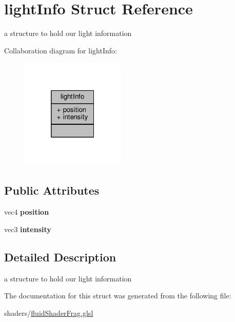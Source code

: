 \hypertarget{structlight_info}{\section{light\-Info Struct Reference}
\label{structlight_info}
}


a structure to hold our light information  




Collaboration diagram for light\-Info\-:\nopagebreak
\begin{figure}[H]
\begin{center}
\leavevmode
\includegraphics[width=140pt]{structlight_info__coll__graph}
\end{center}
\end{figure}
\subsection*{Public Attributes}
\begin{DoxyCompactItemize}
\item 
\hypertarget{structlight_info_a91464db499bb017224ed4137db3ad357}{vec4 {\bfseries position}}\label{structlight_info_a91464db499bb017224ed4137db3ad357}

\item 
\hypertarget{structlight_info_a0a3a282dd8998aed665222fd1902611f}{vec3 {\bfseries intensity}}\label{structlight_info_a0a3a282dd8998aed665222fd1902611f}

\end{DoxyCompactItemize}


\subsection{Detailed Description}
a structure to hold our light information 

The documentation for this struct was generated from the following file\-:\begin{DoxyCompactItemize}
\item 
shaders/\hyperlink{fluid_shader_frag_8glsl}{fluid\-Shader\-Frag.\-glsl}\end{DoxyCompactItemize}
